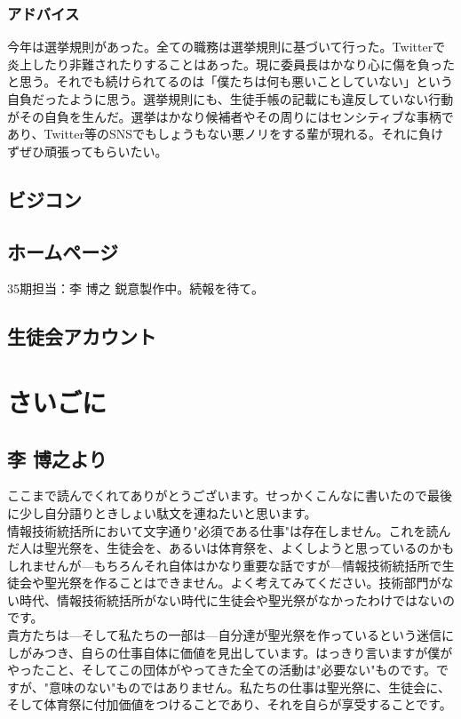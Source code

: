 \documentclass[dvipdfmx,jb5]{jarticle}
\begin{document}
\subsubsection{アドバイス}
今年は選挙規則があった。全ての職務は選挙規則に基づいて行った。Twitterで炎上したり非難されたりすることはあった。現に委員長はかなり心に傷を負ったと思う。それでも続けられてるのは「僕たちは何も悪いことしていない」という自負だったように思う。選挙規則にも、生徒手帳の記載にも違反していない行動がその自負を生んだ。選挙はかなり候補者やその周りにはセンシティブな事柄であり、Twitter等のSNSでもしょうもない悪ノリをする輩が現れる。それに負けずぜひ頑張ってもらいたい。
\subsection{ビジコン}
\subsection{ホームページ}
35期担当：李 博之
鋭意製作中。続報を待て。
\subsection{生徒会アカウント}



\section{さいごに}
\subsection{李 博之より}
ここまで読んでくれてありがとうございます。せっかくこんなに書いたので最後に少し自分語りときしょい駄文を連ねたいと思います。
\\

情報技術統括所において文字通り"必須である仕事"は存在しません。これを読んだ人は聖光祭を、生徒会を、あるいは体育祭を、よくしようと思っているのかもしれませんが---もちろんそれ自体はかなり重要な話ですが---情報技術統括所で生徒会や聖光祭を作ることはできません。よく考えてみてください。技術部門がない時代、情報技術統括所がない時代に生徒会や聖光祭がなかったわけではないのです。
\\

貴方たちは---そして私たちの一部は---自分達が聖光祭を作っているという迷信にしがみつき、自らの仕事自体に価値を見出しています。はっきり言いますが僕がやったこと、そしてこの団体がやってきた全ての活動は"必要ない"ものです。ですが、"意味のない"ものではありません。私たちの仕事は聖光祭に、生徒会に、そして体育祭に付加価値をつけることであり、それを自らが享受することです。
\\
\end{document}
